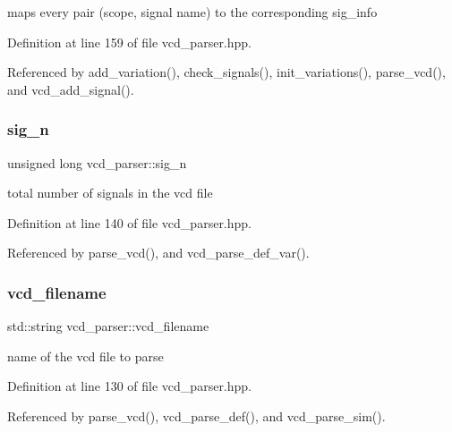 maps every pair (scope, signal name) to the corresponding sig\+\_\+info 



Definition at line 159 of file vcd\+\_\+parser.\+hpp.



Referenced by add\+\_\+variation(), check\+\_\+signals(), init\+\_\+variations(), parse\+\_\+vcd(), and vcd\+\_\+add\+\_\+signal().

\mbox{\label{classvcd__parser_af1b9f01ff54bcc68ca2ec468fa4b245b}} 
\subsubsection{\texorpdfstring{sig\+\_\+n}{sig\_n}}
{\footnotesize\ttfamily unsigned long vcd\+\_\+parser\+::sig\+\_\+n\hspace{0.3cm}{\ttfamily [private]}}



total number of signals in the vcd file 



Definition at line 140 of file vcd\+\_\+parser.\+hpp.



Referenced by parse\+\_\+vcd(), and vcd\+\_\+parse\+\_\+def\+\_\+var().

\mbox{\label{classvcd__parser_a6f6031b88cb087f0f7b6d76b0ce977a1}} 
\subsubsection{\texorpdfstring{vcd\+\_\+filename}{vcd\_filename}}
{\footnotesize\ttfamily std\+::string vcd\+\_\+parser\+::vcd\+\_\+filename\hspace{0.3cm}{\ttfamily [private]}}



name of the vcd file to parse 



Definition at line 130 of file vcd\+\_\+parser.\+hpp.



Referenced by parse\+\_\+vcd(), vcd\+\_\+parse\+\_\+def(), and vcd\+\_\+parse\+\_\+sim().

